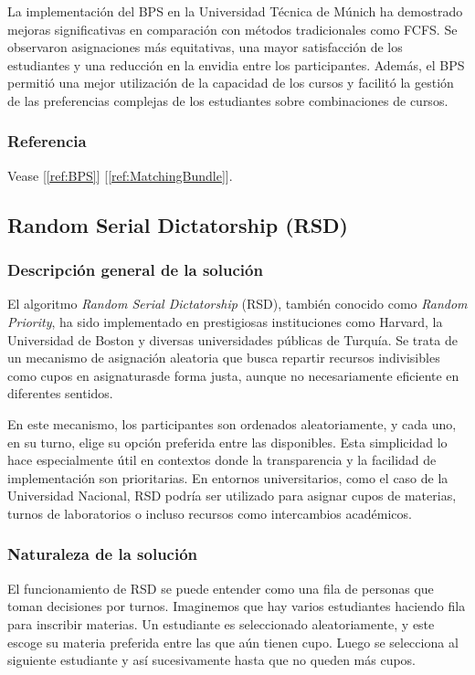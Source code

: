 \documentclass{article}
\begin{document}
La implementación del BPS en la Universidad Técnica de Múnich ha demostrado mejoras significativas en comparación con métodos tradicionales como FCFS. Se observaron asignaciones más equitativas, una mayor satisfacción de los estudiantes y una reducción en la envidia entre los participantes. Además, el BPS permitió una mejor utilización de la capacidad de los cursos y facilitó la gestión de las preferencias complejas de los estudiantes sobre combinaciones de cursos.

\subsubsection{Referencia}

Vease [\ref{ref:BPS}] [\ref{ref:MatchingBundle}].

\subsection{Random Serial Dictatorship (RSD)}

\subsubsection{Descripción general de la solución}

El algoritmo \textit{Random Serial Dictatorship} (RSD), también conocido como 
\textit{Random Priority}, ha sido implementado en prestigiosas 
instituciones como Harvard, la Universidad de Boston y diversas 
universidades públicas de Turquía. Se trata de un mecanismo de asignación 
aleatoria que busca repartir recursos indivisibles como cupos en asignaturasde 
forma justa, aunque no necesariamente eficiente en diferentes sentidos.

En este mecanismo, los participantes son ordenados aleatoriamente, y cada uno, en su 
turno, elige su opción preferida entre las disponibles. Esta simplicidad lo hace 
especialmente útil en contextos donde la transparencia y la facilidad de implementación 
son prioritarias. En entornos universitarios, como el caso de la Universidad Nacional, 
RSD podría ser utilizado para asignar cupos de materias, turnos de laboratorios o 
incluso recursos como intercambios académicos.

\subsubsection{Naturaleza de la solución}

El funcionamiento de RSD se puede entender como una fila de personas que toman decisiones 
por turnos. Imaginemos que hay varios estudiantes haciendo fila para inscribir materias. 
Un estudiante es seleccionado aleatoriamente, y este escoge su materia preferida entre 
las que aún tienen cupo. Luego se selecciona al siguiente estudiante y así sucesivamente 
hasta que no queden más cupos.
\end{document}
